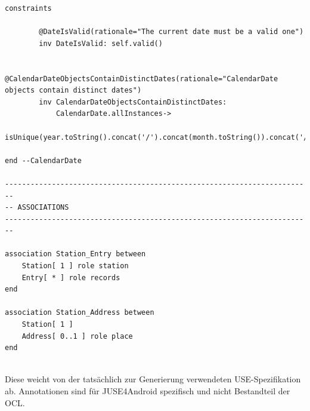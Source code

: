 \documentclass[a4paper,twoside]{article}
\begin{document}
\begin{lstlisting}[caption={Vollständige USE-Spezifikation des IceCream Modells},label=lst:completeUSE]
	constraints
	
		@DateIsValid(rationale="The current date must be a valid one")
		inv DateIsValid: self.valid()
		
		@CalendarDateObjectsContainDistinctDates(rationale="CalendarDate objects contain distinct dates")
		inv CalendarDateObjectsContainDistinctDates:
			CalendarDate.allInstances->
				isUnique(year.toString().concat('/').concat(month.toString()).concat('/').concat(day.toString()))
		
end --CalendarDate

------------------------------------------------------------------------
-- ASSOCIATIONS
------------------------------------------------------------------------
	
association Station_Entry between
	Station[ 1 ] role station
	Entry[ * ] role records
end

association Station_Address between
	Station[ 1 ] 
	Address[ 0..1 ] role place
end


\end{lstlisting}

Diese weicht von der tatsächlich zur Generierung verwendeten USE-Spezifikation ab.
 Annotationen sind für JUSE4Android spezifisch und nicht Bestandteil der OCL.


\twocolumn

\vfill
\end{document}
